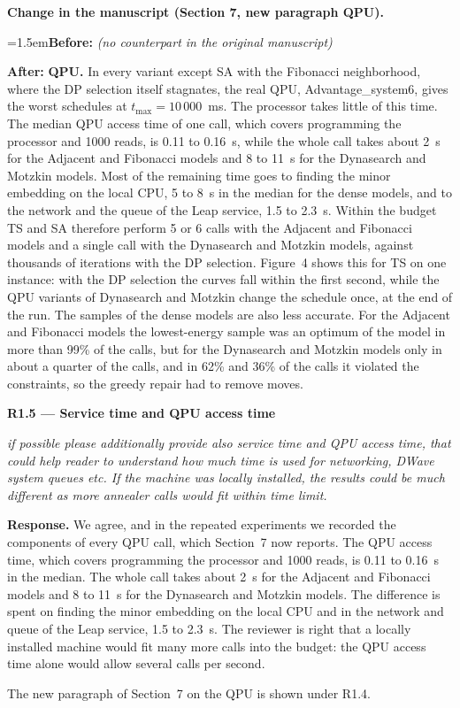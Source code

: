 \documentclass[12pt]{article}
\newenvironment{rc}[1]{\par\medskip\noindent\textbf{#1}\par\nopagebreak\noindent\itshape\renewcommand{\emph}[1]{\textbf{##1}}\ignorespaces}{\par}
\newcommand{\answer}[1]{\par\smallskip\noindent\textbf{Response.} #1\par}
\newcommand{\change}[3]{\par\smallskip\noindent\textbf{Change in the manuscript (#1).}\par
  {\leftskip=1.5em\noindent\textbf{Before:} #2\par\noindent\textbf{After:} #3\par}}
\begin{document}
\change{Section 7, new paragraph QPU}{\textit{(no counterpart in the original manuscript)}}{\textbf{QPU.} In every variant except SA with the Fibonacci neighborhood, where the DP selection itself stagnates, the real QPU, Advantage\_system6, gives the worst schedules at $t_{\max}=10\,000$~ms. The processor takes little of this time. The median QPU access time of one call, which covers programming the processor and 1000 reads, is 0.11 to 0.16~s, while the whole call takes about 2~s for the Adjacent and Fibonacci models and 8 to 11~s for the Dynasearch and Motzkin models. Most of the remaining time goes to finding the minor embedding on the local CPU, 5 to 8~s in the median for the dense models, and to the network and the queue of the Leap service, 1.5 to 2.3~s. Within the budget TS and SA therefore perform 5 or 6 calls with the Adjacent and Fibonacci models and a single call with the Dynasearch and Motzkin models, against thousands of iterations with the DP selection. Figure~4 shows this for TS on one instance: with the DP selection the curves fall within the first second, while the QPU variants of Dynasearch and Motzkin change the schedule once, at the end of the run. The samples of the dense models are also less accurate. For the Adjacent and Fibonacci models the lowest-energy sample was an optimum of the model in more than 99\% of the calls, but for the Dynasearch and Motzkin models only in about a quarter of the calls, and in 62\% and 36\% of the calls it violated the constraints, so the greedy repair had to remove moves.}

\begin{rc}{R1.5 --- Service time and QPU access time}
if possible please additionally provide also service time and QPU access time, that could help reader to understand how much time is used for networking, DWave system queues etc. If the machine was locally installed, the results could be much different as more annealer calls would fit within time limit.
\end{rc}
\answer{We agree, and in the repeated experiments we recorded the components of every QPU call, which Section~7 now reports. The QPU access time, which covers programming the processor and 1000 reads, is 0.11 to 0.16~s in the median. The whole call takes about 2~s for the Adjacent and Fibonacci models and 8 to 11~s for the Dynasearch and Motzkin models. The difference is spent on finding the minor embedding on the local CPU and in the network and queue of the Leap service, 1.5 to 2.3~s. The reviewer is right that a locally installed machine would fit many more calls into the budget: the QPU access time alone would allow several calls per second.}
The new paragraph of Section~7 on the QPU is shown under R1.4.
\end{document}
